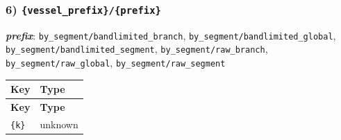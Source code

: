 \documentclass[11pt]{article}
\begin{document}
\subsubsection*{6) \texttt{\{vessel\_\allowbreak{}prefix\}/\allowbreak{}\{prefix\}}}
\textbf{\textit{prefix}}: \texttt{by\_\allowbreak{}segment/\allowbreak{}bandlimited\_\allowbreak{}branch}, \texttt{by\_\allowbreak{}segment/\allowbreak{}bandlimited\_\allowbreak{}global}, \texttt{by\_\allowbreak{}segment/\allowbreak{}bandlimited\_\allowbreak{}segment}, \texttt{by\_\allowbreak{}segment/\allowbreak{}raw\_\allowbreak{}branch}, \texttt{by\_\allowbreak{}segment/\allowbreak{}raw\_\allowbreak{}global}, \texttt{by\_\allowbreak{}segment/\allowbreak{}raw\_\allowbreak{}segment}
\begin{longtable}{|p{}|p{}|}
\hline
\textbf{Key} & \textbf{Type} \\ \hline
\endfirsthead
\hline
\textbf{Key} & \textbf{Type} \\ \hline
\endhead
\texttt{\{k\}} & unknown \\ \hline
\end{longtable}
\end{document}
